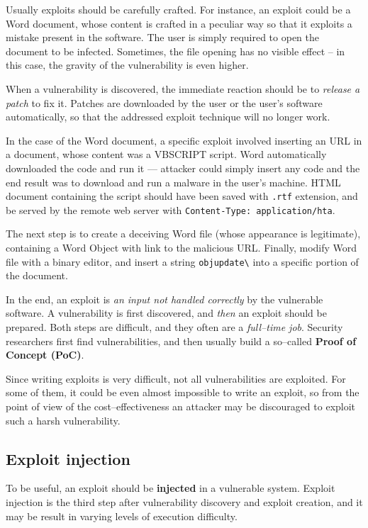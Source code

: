 \documentclass[10pt]{extreport}
\begin{document}
Usually exploits should be carefully crafted. For instance, an exploit could be
a Word document, whose content is crafted in a peculiar way so that it exploits
a mistake present in the software. The user is simply required to open the
document to be infected. Sometimes, the file opening has no visible effect --
in this case, the gravity of the vulnerability is even higher.

When a vulnerability is discovered, the immediate reaction should be to
\emph{release a patch} to fix it. Patches are downloaded by the user or the
user's software automatically, so that the addressed exploit technique will no
longer work.

In the case of the Word document, a specific exploit involved inserting an URL
in a document, whose content was a VBSCRIPT script. Word automatically
downloaded the code and run it --- attacker could simply insert any code and the
end result was to download and run a malware in the user's machine. HTML document
containing the script should have been saved with \texttt{.rtf} extension, and
be served by the remote web server with \texttt{Content-Type: application/hta}.

The next step is to create a deceiving Word file (whose appearance is
legitimate), containing a Word Object with link to the malicious URL. Finally,
modify Word file with a binary editor, and insert a string
\texttt{objupdate\textbackslash} into a specific portion of the document.

In the end, an exploit is \emph{an input not handled correctly} by the
vulnerable software. A vulnerability is first discovered, and \emph{then} an
exploit should be prepared. Both steps are difficult, and they often are a
\emph{full--time job}. Security researchers first find vulnerabilities, and
then usually build a so--called \textbf{Proof of Concept (PoC)}.

Since writing exploits is very difficult, not all vulnerabilities are
exploited. For some of them, it could be even almost impossible to write an
exploit, so from the point of view of the cost--effectiveness an attacker may
be discouraged to exploit such a harsh vulnerability.

\subsection{Exploit injection}

To be useful, an exploit should be \textbf{injected} in a vulnerable system.
Exploit injection is the third step after vulnerability discovery and exploit
creation, and it may be result in varying levels of execution difficulty.
\end{document}
